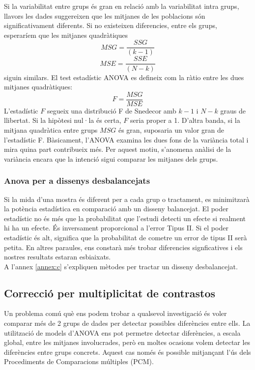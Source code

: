 \documentclass[english]{article}
\begin{document}
Si la variabilitat entre grups és gran en relació amb la variabilitat intra grups, llavors les dades suggereixen que les mitjanes de les poblacions són significativament diferents. Si no existeixen diferencies, entre els grups, esperaríem que les mitjanes quadràtiques
\begin{equation*}
MSG = \frac{SSG}{(k-1)}
\end{equation*}
\begin{equation*}
MSE = \frac{SSE}{(N-k)}
\end{equation*}
siguin similars. El test estadístic ANOVA es defineix com la ràtio entre les dues mitjanes quadràtiques:
\begin{equation*}
F = \frac{MSG}{MSE}
\end{equation*}
L'estadístic $F$ segueix una distribució F de Snedecor amb $k-1$ i $N-k$ graus de llibertat. Si la hipòtesi nul·la és certa, $F$ seria proper a 1. D'altra banda, si la mitjana quadràtica entre grups $MSG$ és gran, suposaria un valor gran de l'estadístic F. Bàsicament, l'ANOVA examina les dues fons de la variància total i mira quina part contribueix més. Per aquest motiu, s'anomena anàlisi de la variància encara que la intenció sigui comparar les mitjanes dels grups.
\\

\subsubsection{Anova per a dissenys desbalancejats}
Si la mida d'una mostra és diferent per a cada grup o tractament, es minimitzarà la potència estadística en comparació amb un disseny balancejat. El poder estadístic no és més que la probabilitat que l'estudi detecti un efecte si realment hi ha un efecte. És inversament proporcional a l'error Tipus II. Si el poder estadístic és alt, significa que la probabilitat de cometre un error de tipus II serà petita. En altres paraules, ens constarà més trobar diferencies signficatives i els nostres resultats estaran esbiaixats.
\\
A l'annex \ref{annex:c} s'expliquen mètodes per tractar un disseny desbalancejat.
\subsection{Correcció per multiplicitat de contrastos}
Un problema comú què ens podem trobar a qualsevol investigació és voler comparar més de 2 grups de dades per detectar possibles diferències entre ells. La utilització de models d'ANOVA ens pot permetre detectar diferències, a escala global, entre les mitjanes involucrades, però en moltes ocasions volem detectar les diferències entre grups concrets. Aquest cas només és possible mitjançant l'ús dels Procediments de Comparacions múltiples (PCM).
\\
\end{document}
